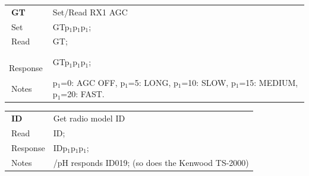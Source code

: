 \documentclass[12pt]{book}
\begin{document}
\begin{center}
\begin{tabular}{|p{2cm}|p{11cm}|}
\toprule
$\phantom{\Big|}$\textbf{\large GT} & Set/Read RX1 AGC \\\cline{1-2}
$\phantom{\Big|}${\large Set} & {GTp$_1$p$_1$p$_1$;} \\\hline
$\phantom{\Big|}${\large Read} & {GT;} \\\hline
$\phantom{\Big|}${\large Response} & {GTp$_1$p$_1$p$_1$;} \\\hline
$\phantom{\Big|}${\large Notes} & \multicolumn{1}{|p{11cm}|}{p$_1$=0: AGC OFF, p$_1$=5: LONG, p$_1$=10: SLOW, p$_1$=15: MEDIUM, p$_1$=20: FAST.} \\
\bottomrule
\end{tabular}
\end{center}

\begin{center}
\begin{tabular}{|p{2cm}|p{11cm}|}
\toprule
$\phantom{\Big|}$\textbf{\large ID} & Get radio model ID \\\cline{1-2}
$\phantom{\Big|}${\large Read} & {ID;} \\\hline
$\phantom{\Big|}${\large Response} & {IDp$_1$p$_1$p$_1$;} \\\hline
$\phantom{\Big|}${\large Notes} & \multicolumn{1}{|p{11cm}|}{/pH responds ID019; (so does the Kenwood TS-2000)} \\
\bottomrule
\end{tabular}
\end{center}
\end{document}
